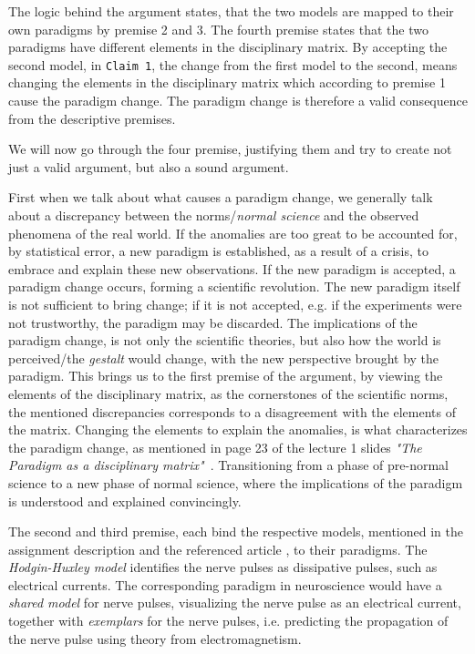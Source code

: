 
The logic behind the argument states, that the two models are mapped to their own paradigms by premise 2 and 3. The fourth premise states that the two paradigms have different elements in the disciplinary matrix. By accepting the second model, in \texttt{Claim 1}, the change from the first model to the second, means changing the elements in the disciplinary matrix which according to premise 1 cause the paradigm change. The paradigm change is therefore a valid consequence from the descriptive premises.

We will now go through the four premise, justifying them and try to create not just a valid argument, but also a sound argument.

First when we talk about what causes a paradigm change, we generally talk about a discrepancy between the norms/\textit{normal science} and the observed phenomena of the real world. If the anomalies are too great to be accounted for, by statistical error, a new paradigm is established, as a result of a crisis, to embrace and explain these new observations. If the new paradigm is accepted, a paradigm change occurs, forming a scientific revolution. The new paradigm itself is not sufficient to bring change; if it is not accepted, e.g. if the experiments were not trustworthy, the paradigm may be discarded. The implications of the paradigm change, is not only the scientific theories, but also how the world is perceived/the \textit{gestalt} would change, with the new perspective brought by the paradigm. This brings us to the first premise of the argument, by viewing the elements of the disciplinary matrix, as the cornerstones of the scientific norms, the mentioned discrepancies corresponds to a disagreement with the elements of the matrix. Changing the elements to explain the anomalies, is what characterizes the paradigm change, as mentioned in page 23 of the lecture 1 slides \textit{"The Paradigm as a disciplinary matrix"} \cite{lecture1slides}. Transitioning from a phase of pre-normal science to a new phase of normal science, where the implications of the paradigm is understood and explained convincingly.

The second and third premise, each bind the respective models, mentioned in the assignment description and the referenced article \cite{SolitonSite}, to their paradigms. The \textit{Hodgin-Huxley model} identifies the nerve pulses as dissipative pulses, such as electrical currents. The corresponding paradigm in neuroscience would have a \textit{shared model} for nerve pulses, visualizing the nerve pulse as an electrical current, together with \textit{exemplars} for the nerve pulses, i.e. predicting the propagation of the nerve pulse using theory from electromagnetism. 

